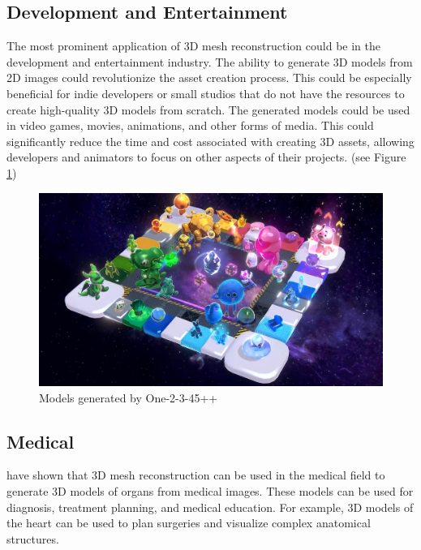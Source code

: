 \subsection{Development and Entertainment}
The most prominent application of 3D mesh reconstruction could be in the development and entertainment industry. The ability to generate 3D models from 2D images could revolutionize the asset creation process.
This could be especially beneficial for indie developers or small studios that do not have the resources to create high-quality 3D models from scratch. The generated models could be used in video games, movies, animations, and other forms of media. This could significantly reduce the time and cost associated with creating 3D assets, allowing developers and animators to focus on other aspects of their projects. (see Figure \ref{fig:one-2-3-4-5-plus-plus-demo})
\begin{figure}
    \centering
    \includegraphics[width=1\linewidth]{images/one-2-3-45++_demo.jpg}
    \caption{Models generated by One-2-3-45++ \autocite{liu_one-2-3-45_2023-1}}
    \label{fig:one-2-3-4-5-plus-plus-demo}
\end{figure}

\subsection{Medical}
\textcite{wang_instantiation-net_2019} have shown that 3D mesh reconstruction can be used in the medical field to generate 3D models of organs from medical images. These models can be used for diagnosis, treatment planning, and medical education. For example, 3D models of the heart can be used to plan surgeries and visualize complex anatomical structures.

